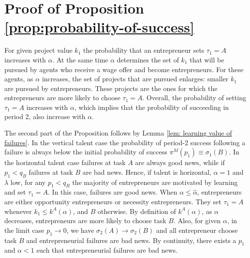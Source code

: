\documentclass[12pt,american]{paper}
\theoremstyle{remark}
\begin{document}
\section*{Proof of Proposition \ref{prop:probability-of-success}}

 For given project value $k_1$ the probability that an entrepreneur sets $\tau_1=A$ increases with $\alpha$. At the same time $\alpha$ determines the set of $k_1$ that will be pursued by agents who receive a wage offer and become entrepreneurs.  For these agents, as $\alpha$ increases, the set of projects that are pursued enlarges: smaller $k_1$ are pursued by entrepreneurs. These projects are the ones for which the entrepreneurs are more likely to choose $\tau_1 =A$. Overall, the probability of setting $\tau_1=A$ increases with $\alpha$, which implies that the probability of succeeding in period 2, also increase with $\alpha$. 
 
 The second part of the Proposition follows by Lemma \ref{lem: learning value of failures}. In the vertical talent case the probability of period-2 success following a failure is always below the initial probability of success $\pi^M(p_1)\equiv\sigma_1(B)$. In the horizontal talent case failures at task $A$ are always good news, while if $p_1<q_B$ failures at task $B$ are bad news.  Hence, if talent is horizontal, $\alpha=1$ and $\lambda$ low, for any $p_1<q_B$  the majority of entrepreneurs are motivated by learning and set $\tau_1=A$. In this case, failures are good news. When  $\alpha \leq \hat \alpha$, entrepreneurs are either opportunity entrepreneurs or necessity entrepreneurs. They set $\tau_1=A$ whenever $k_{1}\leq k^A(\alpha) $, and $B$ otherwise. By definition of $k^A(\alpha)$, as $\alpha$ decreases, entrepreneurs are more likely to choose task $B$. Also, for given $\alpha$, in the limit case $p_1 \rightarrow 0$, we have $ \sigma_2(A) \rightarrow \sigma_2(B)$ and all entrepreneur choose task $B$ and entrepreneurial failures are bad news. By continuity, there exists a $p_1$ and $\alpha<1$ such that entrepreneurial failures are bad news.
\end{document}
